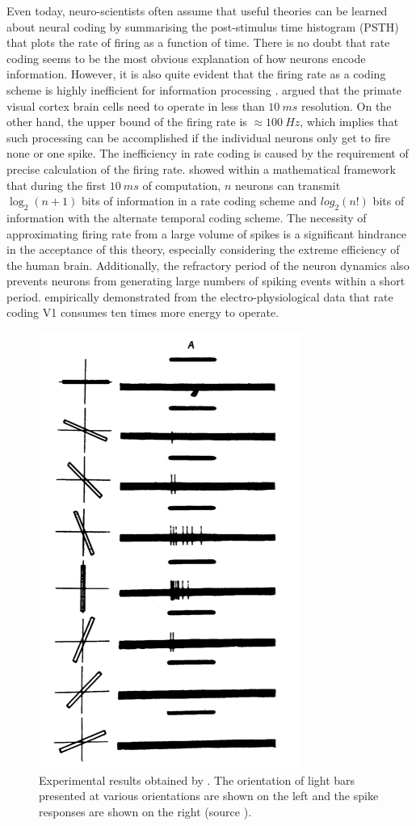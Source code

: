 \begin{enumerate}
	Even today, neuro-scientists often assume that useful theories can be learned about neural coding by summarising the post-stimulus time histogram (PSTH) that plots the rate of firing as a function of time. There is no doubt that rate coding seems to be the most obvious explanation of how neurons encode information. However, it is also quite evident that the firing rate as a coding scheme is highly inefficient for information processing \citep{thorpe2001spike, gautrais1998rate, van2001rate}. \citet{thorpe1989biological} argued that the primate visual cortex brain cells need to operate in less than $10\ ms$  resolution. On the other hand, the upper bound of the firing rate is $\approx 100\ Hz$, which implies that such processing can be accomplished if the individual neurons only get to fire none or one spike. The inefficiency in rate coding is caused by the requirement of precise calculation of the firing rate. \citet{gautrais1998rate} showed within a mathematical framework that during the first $10\ ms$  of computation, $n$ neurons can transmit $\log_2(n+1)$ bits of information in a rate coding scheme and $log_2(n!)$ bits of information with the alternate temporal coding scheme. The necessity of approximating firing rate from a large volume of spikes is a significant hindrance in the acceptance of this theory, especially considering the extreme efficiency of the human brain. Additionally, the refractory period of the neuron dynamics also prevents neurons from generating large numbers of spiking events within a short period.  \citet{olshausen2006other} empirically demonstrated from the electro-physiological data that rate coding V1 consumes ten times more energy to operate.  
		\begin{figure}
		\centering
		\includegraphics[width=0.3\linewidth]{fig/snn/hubel.png}
		\caption{Experimental results obtained by \citet{hubel1962receptive}. The orientation of light bars presented at various orientations are shown on the left and the spike responses are shown on the right (source \citet{hubel1959receptive}).}
		\label{fig:hubel}
	\end{figure}
	

\end{enumerate}
